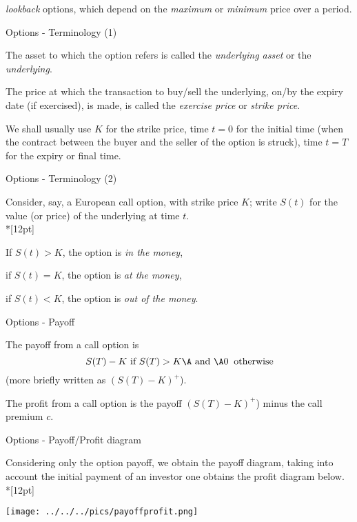 	{\it lookback} options, which
depend on the  {\it maximum} or {\it minimum} price over a period.


{Options - Terminology (1)}


	The asset to which the option refers is called the {\it underlying
asset} or the {\it underlying}.

	The price at which the transaction
to buy/sell the underlying, on/by the expiry date (if exercised),
is made, is called the {\it exercise price} or {\it strike price}.

	We shall usually use $K$ for the strike price, time $t = 0$ for
the initial time (when the contract between the buyer and the
seller of the option is struck), time $t = T$ for the expiry or
final time.


{Options - Terminology (2)}

Consider, say, a European call option, with strike price $K$;
write $S(t)$ for the value (or price) of the underlying at time
$t$.\\*[12pt]


	If $S(t) > K$, the option is {\it in the money},

	if $S(t) = K$, the option is {\it at the money},

	if $S(t) < K$, the option is {\it out of the money}.


{Options - Payoff}


	The payoff from a call option is $$ S(T) - K \mbox{ if } S(T)
> K\A \mbox{ and }\A 0 \;\; \mbox{otherwise} $$ (more briefly
written as  $(S(T) - K)^+$).

	The profit from a call option is the payoff $(S(T) - K)^+$) minus the call premium $c$.



{Options - Payoff/Profit diagram }

Considering only the option payoff, we obtain the payoff diagram, taking into account the initial payment of an investor one obtains the profit diagram below.\\*[12pt]

\begin{center}
\texttt{[image: ../../../pics/payoffprofit.png]}
\end{center}

